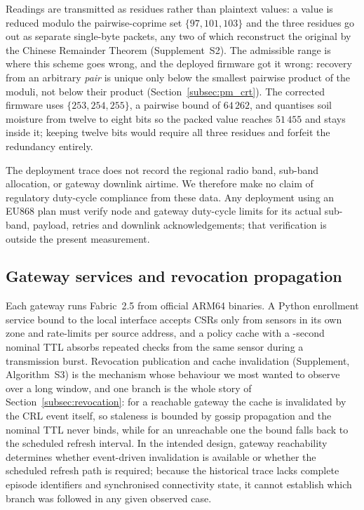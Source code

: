 \documentclass[a4paper,fleqn]{cas-dc}
\begin{document}
Readings are transmitted as residues rather than plaintext values: a value
is reduced modulo the pairwise-coprime set $\{97, 101, 103\}$ and the three
residues go out as separate single-byte packets, any two of which
reconstruct the original by the Chinese Remainder Theorem
\cite{garner1959residue} (Supplement~S2). The admissible range is where
this scheme goes wrong, and the deployed firmware got it wrong: recovery
from an arbitrary \emph{pair} is unique only below the smallest pairwise
product of the moduli, not below their product (Section~\ref{subsec:pm_crt}).
The corrected firmware uses $\{253, 254, 255\}$, a pairwise bound of
$64\,262$, and quantises soil moisture from twelve to eight bits so the
packed value reaches $51\,455$ and stays inside it; keeping twelve bits
would require all three residues and forfeit the redundancy entirely.

The deployment trace does not record the regional radio band, sub-band
allocation, or gateway downlink airtime. We therefore make no claim of
regulatory duty-cycle compliance from these data. Any deployment using an
EU868 plan must verify node and gateway duty-cycle limits for its actual
sub-band, payload, retries and downlink acknowledgements; that verification
is outside the present measurement.

\subsection{Gateway services and revocation propagation}
\label{subsec:gateway}

Each gateway runs Fabric~2.5 from official ARM64 binaries. A Python
enrollment service bound to the local interface accepts CSRs only from
sensors in its own zone and rate-limits per source address, and a policy
cache with a \RevCacheTTL-second nominal TTL absorbs repeated checks from
the same sensor during a transmission burst. Revocation publication and
cache invalidation (Supplement, Algorithm~S3) is the mechanism whose
behaviour we most wanted to observe over a long window, and one branch is
the whole story of Section~\ref{subsec:revocation}: for a reachable
gateway the cache is invalidated by the CRL event itself, so staleness is
bounded by gossip propagation and the nominal TTL never binds, while for an
unreachable one the bound falls back to the scheduled refresh interval.
In the intended design, gateway reachability determines whether
event-driven invalidation is available or whether the scheduled refresh
path is required; because the historical trace lacks complete episode
identifiers and synchronised connectivity state, it cannot establish
which branch was followed in any given observed case.
\end{document}

